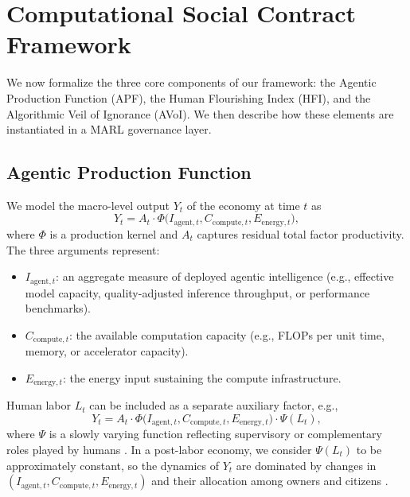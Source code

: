 \documentclass{article}
\begin{document}
\section{Computational Social Contract Framework}
\label{sec:framework}

We now formalize the three core components of our framework: the Agentic Production Function (APF), the Human Flourishing Index (HFI), and the Algorithmic Veil of Ignorance (AVoI). We then describe how these elements are instantiated in a MARL governance layer.

\subsection{Agentic Production Function}
\label{subsec:apf}

We model the macro-level output $Y_t$ of the economy at time $t$ as
\begin{equation}
Y_t = A_t \cdot \Phi\big(I_{\text{agent},t}, C_{\text{compute},t}, E_{\text{energy},t}\big),
\end{equation}
where $\Phi$ is a production kernel and $A_t$ captures residual total factor productivity. The three arguments represent:

\begin{itemize}
  \item $I_{\text{agent},t}$: an aggregate measure of deployed agentic intelligence (e.g., effective model capacity, quality-adjusted inference throughput, or performance benchmarks).
  \item $C_{\text{compute},t}$: the available computation capacity (e.g., FLOPs per unit time, memory, or accelerator capacity).
  \item $E_{\text{energy},t}$: the energy input sustaining the compute infrastructure.
\end{itemize}

Human labor $L_t$ can be included as a separate auxiliary factor, e.g.,
\begin{equation}
Y_t = A_t \cdot \Phi\big(I_{\text{agent},t}, C_{\text{compute},t}, E_{\text{energy},t}\big) \cdot \Psi(L_t),
\end{equation}
where $\Psi$ is a slowly varying function reflecting supervisory or complementary roles played by humans \cite{jordan2024artificial}. In a post-labor economy, we consider $\Psi(L_t)$ to be approximately constant, so the dynamics of $Y_t$ are dominated by changes in $(I_{\text{agent},t}, C_{\text{compute},t}, E_{\text{energy},t})$ and their allocation among owners and citizens \cite{li2025towards}.
\end{document}
